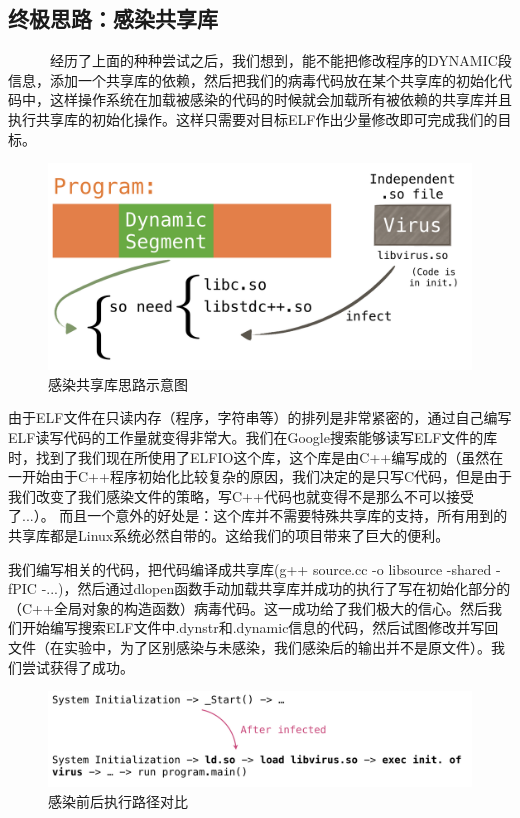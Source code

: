 \documentclass[a4paper, 11pt]{article}
\begin{document}
\subsection{终极思路：感染共享库}
~~~~~~经历了上面的种种尝试之后，我们想到，能不能把修改程序的DYNAMIC段信息，添加一个共享库的依赖，然后把我们的病毒代码放在某个共享库的初始化代码中，这样操作系统在加载被感染的代码的时候就会加载所有被依赖的共享库并且执行共享库的初始化操作。这样只需要对目标ELF作出少量修改即可完成我们的目标。

\begin{figure}[htbp]
		\centering
		\includegraphics[width = \textwidth]{figures/fig4_ld1}
		\caption{感染共享库思路示意图}
		\label{fig:way4}
\end{figure}

由于ELF文件在只读内存（程序，字符串等）的排列是非常紧密的，通过自己编写ELF读写代码的工作量就变得非常大。我们在Google搜索能够读写ELF文件的库时，找到了我们现在所使用了ELFIO这个库，这个库是由C++编写成的（虽然在一开始由于C++程序初始化比较复杂的原因，我们决定的是只写C代码，但是由于我们改变了我们感染文件的策略，写C++代码也就变得不是那么不可以接受了...）。 而且一个意外的好处是：这个库并不需要特殊共享库的支持，所有用到的共享库都是Linux系统必然自带的。这给我们的项目带来了巨大的便利。

我们编写相关的代码，把代码编译成共享库(g++ source.cc -o libsource -shared -fPIC -...)，然后通过dlopen函数手动加载共享库并成功的执行了写在初始化部分的（C++全局对象的构造函数）病毒代码。这一成功给了我们极大的信心。然后我们开始编写搜索ELF文件中.dynstr和.dynamic信息的代码，然后试图修改并写回文件（在实验中，为了区别感染与未感染，我们感染后的输出并不是原文件）。我们尝试获得了成功。
\begin{figure}[htbp]
		\centering
		\includegraphics[width = \textwidth]{figures/fig5_ld2}
		\caption{感染前后执行路径对比}
		\label{fig:way4}
\end{figure}
\end{document}
